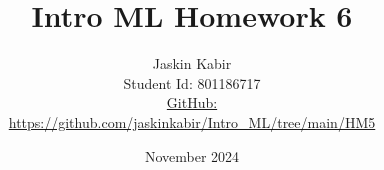 \title{\Huge Intro ML Homework 6}

\author{ \huge
Jaskin Kabir \\
\Large Student Id: 801186717 \\
\Large \href{https://github.com/jaskinkabir/Intro_ML/tree/main/HM6}{GitHub:}\\\url{https://github.com/jaskinkabir/Intro_ML/tree/main/HM5}
}

\date{November 2024}

\begin{titlingpage}
\maketitle
\end{titlingpage}